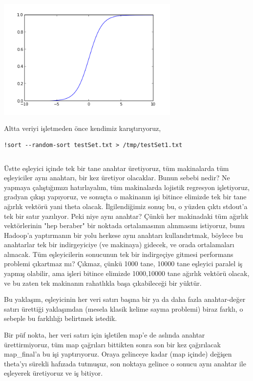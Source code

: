 \documentclass[12pt,fleqn]{article}\usepackage{../../common}
\begin{document}
\includegraphics[height=6cm]{logreg1.png}

Altta veriyi işletmeden önce kendimiz karıştırıyoruz,

\begin{verbatim}
!sort --random-sort testSet.txt > /tmp/testSet1.txt
\end{verbatim}

\inputminted[fontsize=\footnotesize]{python}{logreg.py}

Üstte eşleyici içinde tek bir tane anahtar üretiyoruz, tüm makinalarda tüm
eşleyiciler aynı anahtarı, bir kez üretiyor olacaklar. Bunun sebebi nedir?
Ne yapmaya çalıştığımızı hatırlayalım, tüm makinalarda lojistik regresyon
işletiyoruz, gradyan çıkışı yapıyoruz, ve sonuçta o makinanın işi bitince
elimizde tek bir tane ağırlık vektörü yani theta olacak. İlgilendiğimiz
sonuç bu, o yüzden çıktı stdout'a tek bir satır yazılıyor. Peki niye aynı
anahtar? Çünkü her makinadaki tüm ağırlık vektörlerinin "hep beraber" bir
noktada ortalamasının alınmasını istiyoruz, bunu Hadoop'a yaptırmanın bir
yolu herkese aynı anahtarı kullandırtmak, böylece bu anahtarlar tek bir
indirgeyiciye (ve makinaya) gidecek, ve orada ortalamaları alınacak. Tüm
eşleyicilerin sonucunun tek bir indirgeçiye gitmesi performans problemi
çıkartmaz mı? Çıkmaz, çünkü 1000 tane, 10000 tane eşleyici paralel iş
yapmış olabilir, ama işleri bitince elimizde 1000,10000 tane ağırlık
vektörü olacak, ve bu zaten tek makinanın rahatlıkla başa çıkabileceği bir
yüktür.

Bu yaklaşım, eşleyicinin her veri satırı başına bir ya da daha fazla
anahtar-değer satırı ürettiği yaklaşımdan (mesela klasik kelime sayma
problemi) biraz farklı, o sebeple bu farklılığı belirtmek istedik.

Bir püf nokta, her veri satırı için işletilen map'e de aslında anahtar
ürettirmiyoruz, tüm map çağrıları bittikten sonra son bir kez çağırılacak
map\_final'a bu işi yaptırıyoruz. Oraya gelinceye kadar (map içinde) değişen
theta'yı sürekli hafızada tutmuşuz, son noktaya gelince o sonucu aynı
anahtar ile eşleyerek üretiyoruz ve iş bitiyor.
\end{document}
